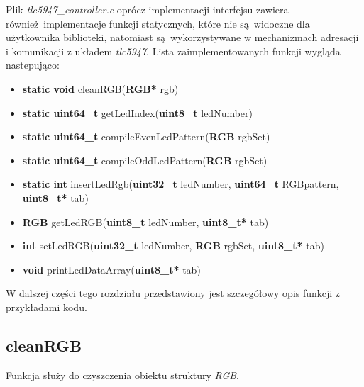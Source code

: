 \documentclass[eng,printmode]{mgr}
\begin{document}
\vspace{0.3cm}

Plik \emph{tlc5947\_controller.c} oprócz implementacji interfejsu zawiera również implementacje funkcji statycznych, które nie są widoczne dla użytkownika biblioteki, natomiast są wykorzystywane w mechanizmach adresacji i komunikacji z układem \emph{tlc5947}. Lista zaimplementowanych funkcji wygląda nastepująco:


  \begin{itemize}[before=\ttfamily]
    \item{\textbf{static void} cleanRGB(\textbf{RGB*} rgb)}
    \item{\textbf{static uint64\_t} getLedIndex(\textbf{uint8\_t} ledNumber)} 
    \item{\textbf{static uint64\_t} compileEvenLedPattern(\textbf{RGB} rgbSet)} 
    \item{\textbf{static uint64\_t} compileOddLedPattern(\textbf{RGB} rgbSet)} 
    \item{\textbf{static int} insertLedRgb(\textbf{uint32\_t} ledNumber, \textbf{uint64\_t} RGBpattern, \textbf{uint8\_t*} tab)} 
    \item{\textbf{RGB} getLedRGB(\textbf{uint8\_t} ledNumber, \textbf{uint8\_t*} tab)} 
    \item{\textbf{int} setLedRGB(\textbf{uint32\_t} ledNumber, \textbf{RGB} rgbSet, \textbf{uint8\_t*} tab)} 
    \item{\textbf{void} printLedDataArray(\textbf{uint8\_t*} tab)} 
  \end{itemize}

\vspace{0.7cm}

W dalszej części tego rozdziału przedstawiony jest szczegółowy opis funkcji z przykładami kodu.

\subsection{cleanRGB} 

Funkcja służy do czyszczenia obiektu struktury \emph{RGB}.
\end{document}
